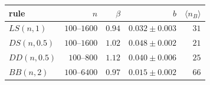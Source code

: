 \begin{center}
\small
\begin{tabular}{lrrrr}
\hline
rule & $n$ & $\beta$ & $b$ & $\langle n_B\rangle$\\
\hline
$LS(n,1)$ & $100$--$1600$ & $0.94$ & $0.032\pm0.003$ & $31$\\
$DS(n,0.5)$ & $100$--$1600$ & $1.02$ & $0.048\pm0.002$ & $21$\\
$DD(n,0.5)$ & $100$--$800$ & $1.12$ & $0.040\pm0.006$ & $25$\\
$BB(n,2)$ & $100$--$6400$ & $0.97$ & $0.015\pm0.002$ & $66$\\
\hline
\end{tabular}
\end{center}
